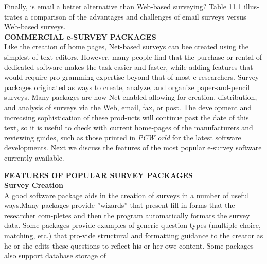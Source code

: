 \documentclass[a4,9pt]{beamer}
\begin{document}
\begin{frame}
\hspace*{0.5cm} Finally, is email a better alternative than Web-based surveying? Table 11.1 illus-trates a comparison of the advantages and challenges of email surveys versus Web-based surveys.\\

\vspace*{0.5cm}
\textbf{COMMERCIAL e-SURVEY PACKAGES}\\

\vspace*{0.2cm}
\small{
Like the creation of home pages, Net-based surveys can bee created using the simplest of text editors. However, many people find that the purchase or rental of dedicated software makes the task easier and faster, while adding features that would require pro-gramming expertise beyond that of most e-researchers. Survey packages originated as ways to create, analyze, and organize paper-and-pencil surveys. Many packages are now Net enabled allowing for creation, distribution, and analysis of surveys via the Web, email, fax, or post. The development and increasing sophistication of these prod-ucts will continue past the date of this text, so it is useful to check with current home-pages of the manufacturers and reviewing guides, such as those printed in \emph{PCW orld} for the latest software developments. Next we discuss the features of the most popular e-survey software currently available.}\\

\vspace*{0.5cm}
\end{frame}

\begin{frame}
\textbf{FEATURES OF POPULAR SURVEY PACKAGES}\\

\vspace*{0.5cm}
\textbf{Survey Creation}\\

\vspace*{0.3cm}
A good software package aids in the creation of surveys in a number of useful ways.Many packages provide ''wizards'' that present fill-in forms that the researcher com-pletes and then the program automatically formats the survey data. Some packages provide examples of generic question types (multiple choice, matching, etc.) that pro-vide structural and formatting guidance to the creator as he or she edits these questions to reflect his or her owe content. Some packages also support database storage of \\
\end{frame}
\end{document}
